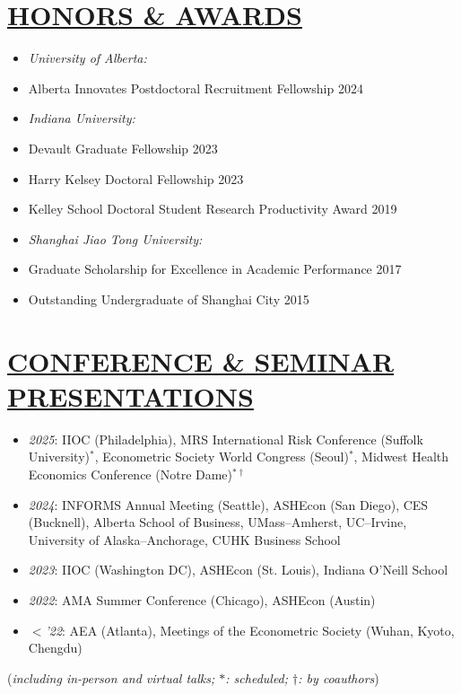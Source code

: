 \documentclass{res}
\begin{document}
\begin{resume}
\section{\large{\ul{HONORS \& AWARDS}}}
\vspace{1.8em}
\begin{itemize}[leftmargin=!,labelindent=-15pt,itemindent=-15pt,itemsep=0.1em]
\item[] \textit{University of Alberta:}
    \item[] \hspace{15pt} Alberta Innovates Postdoctoral Recruitment Fellowship \hfill 2024
\item[] \textit{Indiana University:}
    \item[] \hspace{15pt} Devault Graduate Fellowship \hfill 2023
    \item[] \hspace{15pt} Harry Kelsey Doctoral Fellowship \hfill 2023
    \item[] \hspace{15pt} Kelley School Doctoral Student Research Productivity Award \hfill 2019
\item[] \textit{Shanghai Jiao Tong University:}
    \item[] \hspace{15pt} Graduate Scholarship for Excellence in Academic Performance \hfill 2017
    \item[] \hspace{15pt} Outstanding Undergraduate of Shanghai City \hfill 2015
\end{itemize}

\section{\large{\ul{CONFERENCE \& SEMINAR PRESENTATIONS}}}
\vspace{1.8em}
\begin{itemize}[leftmargin=!,labelindent=-15pt,itemindent=-24pt,itemsep=0.1em]
\item[] \textit{2025}: IIOC (Philadelphia), MRS International Risk Conference (Suffolk University)$^*$, Econometric Society World Congress (Seoul)$^*$, Midwest Health Economics Conference (Notre Dame)$^{*\dagger}$
\item[] \textit{2024}: INFORMS Annual Meeting (Seattle), ASHEcon (San Diego), CES (Bucknell), Alberta School of Business, UMass–Amherst, UC–Irvine, University of Alaska–Anchorage, CUHK Business School
\item[] \textit{2023}: IIOC (Washington DC), ASHEcon (St. Louis), Indiana O'Neill School 
\item[] \textit{2022}: AMA Summer Conference (Chicago), ASHEcon (Austin) 
\item[] \textit{$<$'22}: AEA (Atlanta), Meetings of the Econometric Society (Wuhan, Kyoto, Chengdu)
\end{itemize}
\hfill {\small (\textit{including in-person and virtual talks; $*$: scheduled; $\dagger$: by coauthors})}

\end{resume}
\end{document}
